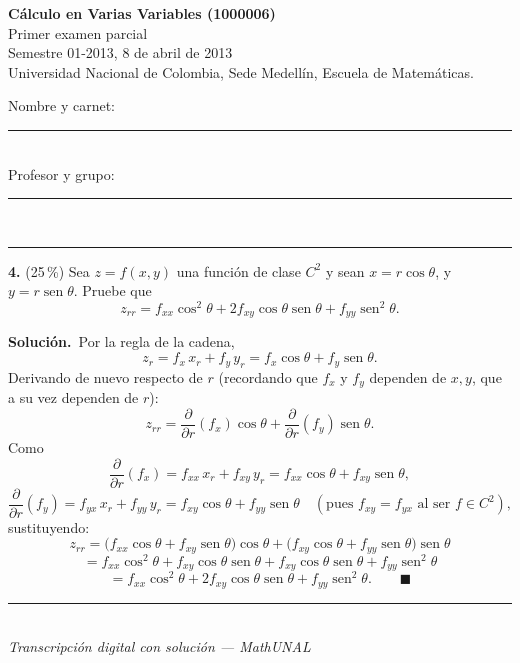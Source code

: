 \documentclass[11pt]{article}
\newcommand{\sol}{\medskip\noindent\textbf{\textcolor{solgreen}{Soluci\'on.}}\ }
\newcommand{\examheader}{%
  \noindent
  \begin{minipage}[t]{0.62\linewidth}
    {\bfseries\large C\'alculo en Varias Variables (1000006)}\\
    {\small Primer examen parcial}\\
    {\small Semestre 01-2013, 8 de abril de 2013}\\
    {\small Universidad Nacional de Colombia, Sede Medell\'in, Escuela de Matem\'aticas.}
  \end{minipage}%
  \hfill
  \begin{minipage}[t]{0.33\linewidth}
    \raggedleft\small
    Nombre y carnet: \rule{2.5cm}{0.4pt}\\[4pt]
    Profesor y grupo: \rule{2.5cm}{0.4pt}
  \end{minipage}\\[4pt]
  \rule{\linewidth}{0.6pt}
}
\newcommand{\examfooter}{%
  \vfill
  \rule{\linewidth}{0.4pt}\\[1pt]
  {\scriptsize\textit{Transcripci\'on digital con soluci\'on --- MathUNAL}\hfill\textcolor{unalblue}{\textbf{\thepage}}}
}
\begin{document}
\newpage
\examheader
\vspace{2pt}

\noindent\textbf{4.} (25\,\%) Sea $z=f(x,y)$ una funci\'on de clase $C^2$ y sean $x=r\cos\theta$, y $y=r\operatorname{sen}\theta$. Pruebe que
$$z_{rr} = f_{xx}\cos^2\theta + 2f_{xy}\cos\theta\operatorname{sen}\theta + f_{yy}\operatorname{sen}^2\theta.$$

\sol Por la regla de la cadena,
$$z_r = f_x\,x_r + f_y\,y_r = f_x\cos\theta + f_y\operatorname{sen}\theta.$$
Derivando de nuevo respecto de $r$ (recordando que $f_x$ y $f_y$ dependen de $x,y$, que a su vez dependen de $r$):
$$z_{rr} = \frac{\partial}{\partial r}(f_x)\cos\theta + \frac{\partial}{\partial r}(f_y)\operatorname{sen}\theta.$$
Como
$$\frac{\partial}{\partial r}(f_x) = f_{xx}\,x_r + f_{xy}\,y_r = f_{xx}\cos\theta + f_{xy}\operatorname{sen}\theta,$$
$$\frac{\partial}{\partial r}(f_y) = f_{yx}\,x_r + f_{yy}\,y_r = f_{xy}\cos\theta + f_{yy}\operatorname{sen}\theta \quad (\text{pues } f_{xy}=f_{yx} \text{ al ser } f\in C^2),$$
sustituyendo:
$$z_{rr} = \big(f_{xx}\cos\theta + f_{xy}\operatorname{sen}\theta\big)\cos\theta + \big(f_{xy}\cos\theta + f_{yy}\operatorname{sen}\theta\big)\operatorname{sen}\theta$$
$$= f_{xx}\cos^2\theta + f_{xy}\cos\theta\operatorname{sen}\theta + f_{xy}\cos\theta\operatorname{sen}\theta + f_{yy}\operatorname{sen}^2\theta$$
$$= f_{xx}\cos^2\theta + 2f_{xy}\cos\theta\operatorname{sen}\theta + f_{yy}\operatorname{sen}^2\theta. \qquad \blacksquare$$

\vfill
\examfooter
\end{document}
